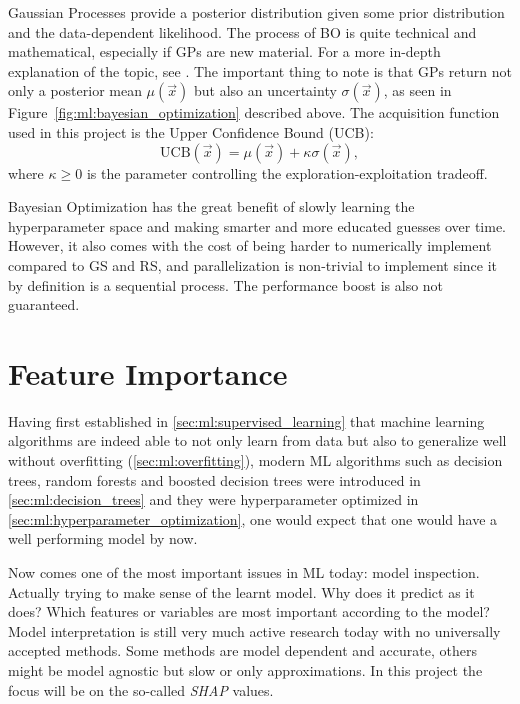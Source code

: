 Gaussian Processes provide a posterior distribution given some prior distribution and the data-dependent likelihood. The process of BO is quite technical and mathematical, especially if GPs are new material. For a more in-depth explanation of the topic, see \citet{brochuTutorialBayesianOptimization2010}. The important thing to note is that GPs return not only a posterior mean $\mu(\vec{x})$ but also an uncertainty $\sigma(\vec{x})$, as seen in Figure~\ref{fig:ml:bayesian_optimization} described above. The acquisition function used in this project is the Upper Confidence Bound (UCB):
\begin{equation}
  \mathrm{UCB}(\vec{x}) = \mu(\vec{x}) + \kappa \sigma(\vec{x}),
\end{equation}
where $\kappa \geq 0$ is the parameter controlling the exploration-exploitation tradeoff. 

Bayesian Optimization has the great benefit of slowly learning the hyperparameter space and making smarter and more educated guesses over time. However, it also comes with the cost of being harder to numerically implement compared to GS and RS, and parallelization is non-trivial to implement since it by definition is a sequential process. The performance boost is also not guaranteed. 

\section{Feature Importance}
\label{sec:ml:feature_importance}
Having first established in \autoref{sec:ml:supervised_learning} that machine learning algorithms are indeed able to not only learn from data but also to generalize well without overfitting (\autoref{sec:ml:overfitting}), modern ML algorithms such as decision trees, random forests and boosted decision trees were introduced in \autoref{sec:ml:decision_trees} and they were hyperparameter optimized in \autoref{sec:ml:hyperparameter_optimization}, one would expect that one would have a well performing model by now. 

Now comes one of the most important issues in ML today: model inspection. Actually trying to make sense of the learnt model. Why does it predict as it does? Which features or variables are most important according to the model? Model interpretation is still very much active research today with no universally accepted methods. Some methods are model dependent and accurate, others might be model agnostic but slow or only approximations. In this project the focus will be on the so-called \emph{SHAP} values. 

